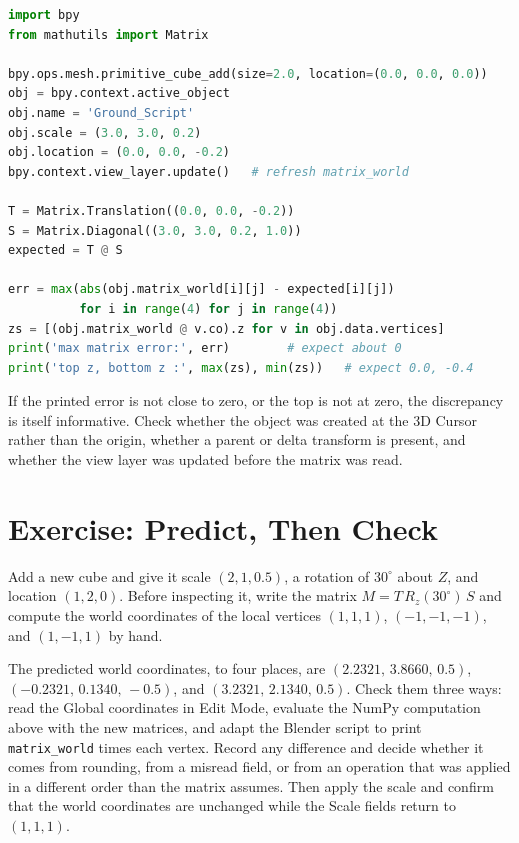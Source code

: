 \begin{lstlisting}[language=Python,basicstyle=\ttfamily\footnotesize,breaklines=true,frame=single,columns=fullflexible,keepspaces=true]
import bpy
from mathutils import Matrix

bpy.ops.mesh.primitive_cube_add(size=2.0, location=(0.0, 0.0, 0.0))
obj = bpy.context.active_object
obj.name = 'Ground_Script'
obj.scale = (3.0, 3.0, 0.2)
obj.location = (0.0, 0.0, -0.2)
bpy.context.view_layer.update()   # refresh matrix_world

T = Matrix.Translation((0.0, 0.0, -0.2))
S = Matrix.Diagonal((3.0, 3.0, 0.2, 1.0))
expected = T @ S

err = max(abs(obj.matrix_world[i][j] - expected[i][j])
          for i in range(4) for j in range(4))
zs = [(obj.matrix_world @ v.co).z for v in obj.data.vertices]
print('max matrix error:', err)        # expect about 0
print('top z, bottom z :', max(zs), min(zs))   # expect 0.0, -0.4
\end{lstlisting}

If the printed error is not close to zero, or the top is not at zero, the discrepancy is itself informative. Check whether the object was created at the 3D Cursor rather than the origin, whether a parent or delta transform is present, and whether the view layer was updated before the matrix was read.

\section{Exercise: Predict, Then Check}

\begin{exercise}
Add a new cube and give it scale $(2,1,0.5)$, a rotation of $30^\circ$ about $Z$, and location $(1,2,0)$. Before inspecting it, write the matrix $M=T\,R_z(30^\circ)\,S$ and compute the world coordinates of the local vertices $(1,1,1)$, $(-1,-1,-1)$, and $(1,-1,1)$ by hand.

The predicted world coordinates, to four places, are $(2.2321,\,3.8660,\,0.5)$, $(-0.2321,\,0.1340,\,-0.5)$, and $(3.2321,\,2.1340,\,0.5)$. Check them three ways: read the Global coordinates in Edit Mode, evaluate the NumPy computation above with the new matrices, and adapt the Blender script to print \texttt{matrix\_world} times each vertex. Record any difference and decide whether it comes from rounding, from a misread field, or from an operation that was applied in a different order than the matrix assumes. Then apply the scale and confirm that the world coordinates are unchanged while the Scale fields return to $(1,1,1)$.
\end{exercise}
